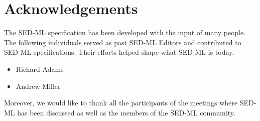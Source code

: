 \chapter{Acknowledgements}
\label{sec:acknowledgments}
The SED-ML specification has been developed with the input of many people. The following individuals served as past SED-ML Editors and contributed to SED-ML specifications. Their efforts helped shape what SED-ML is today.
\begin{itemize}
\item Richard Adams
\item Andrew Miller
\end{itemize}

Moreover, we would like to thank all the participants of the meetings where SED-ML has been discussed as well as the members of the SED-ML community.


